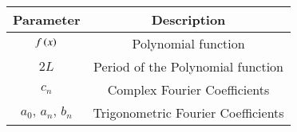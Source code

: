 \begin{tabular}[12pt]{ |c| c|}
    \hline
    \textbf{Parameter} & \textbf{Description}\\ 
    \hline
    $f\left(x\right)$ & Polynomial function\\
    \hline
    $2L$& Period of the Polynomial function\\ 
    \hline
    $c_n$ & Complex Fourier Coefficients\\
    \hline
    $a_0,\,a_n,\,b_n$& Trigonometric Fourier Coefficients\\
    \hline   
    \end{tabular}